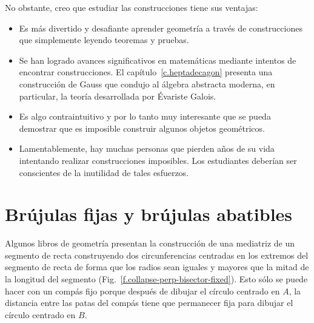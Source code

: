 No obstante, creo que estudiar las construcciones tiene sus ventajas:
\begin{itemize}
\item Es más divertido y desafiante aprender geometría a través de construcciones que simplemente leyendo teoremas y pruebas.
\item Se han logrado avances significativos en matemáticas mediante intentos de encontrar construcciones. El capítulo~\ref{c.heptadecagon} presenta una construcción de Gauss que condujo al álgebra abstracta moderna, en particular, la teoría desarrollada por \'{E}variste Galois.
\item Es algo contraintuitivo y por lo tanto muy interesante que se pueda demostrar que es imposible construir algunos objetos geométricos.
\item Lamentablemente, hay muchas personas que pierden años de su vida intentando realizar construcciones imposibles. Los estudiantes deberían ser conscientes de la inutilidad de tales esfuerzos.
\end{itemize}

\section{Brújulas fijas y brújulas abatibles}\label{s.collapse}

Algunos libros de geometría presentan la construcción de una mediatriz de un segmento de recta construyendo dos circunferencias centradas en los extremos del segmento de recta de forma que los radios sean iguales y mayores que la mitad de la longitud del segmento (Fig.~\ref{f.collapse-perp-bisector-fixed}). Esto sólo se puede hacer con un compás fijo porque después de dibujar el círculo centrado en $A$, la distancia entre las patas del compás tiene que permanecer fija para dibujar el círculo centrado en $B$.

